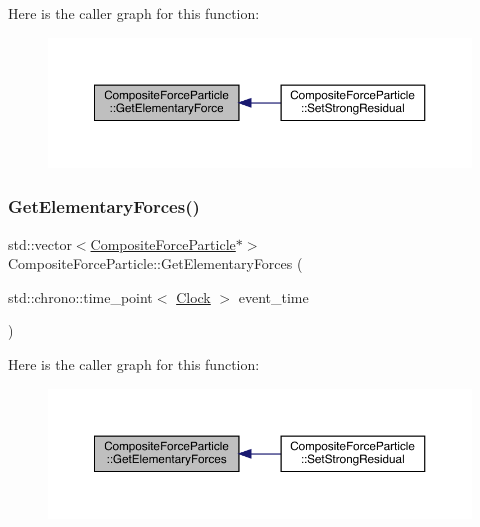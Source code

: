 Here is the caller graph for this function\+:\nopagebreak
\begin{figure}[H]
\begin{center}
\leavevmode
\includegraphics[width=350pt]{class_composite_force_particle_a63b3daf44517c90bb805b6612dd26acc_icgraph}
\end{center}
\end{figure}
\mbox{\label{class_composite_force_particle_a2e9da0590067cf243c0f2d239f712e7f}} 
\subsubsection{\texorpdfstring{Get\+Elementary\+Forces()}{GetElementaryForces()}}
{\footnotesize\ttfamily std\+::vector$<$\hyperlink{class_composite_force_particle}{Composite\+Force\+Particle}$\ast$$>$ Composite\+Force\+Particle\+::\+Get\+Elementary\+Forces (\begin{DoxyParamCaption}\item[{std\+::chrono\+::time\+\_\+point$<$ \hyperlink{universe_8h_a0ef8d951d1ca5ab3cfaf7ab4c7a6fd80}{Clock} $>$}]{event\+\_\+time }\end{DoxyParamCaption})}

Here is the caller graph for this function\+:\nopagebreak
\begin{figure}[H]
\begin{center}
\leavevmode
\includegraphics[width=350pt]{class_composite_force_particle_a2e9da0590067cf243c0f2d239f712e7f_icgraph}
\end{center}
\end{figure}
\mbox{\label{class_composite_force_particle_a750da9f3cd367287b051b820857c80d0}} 
